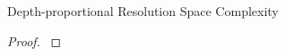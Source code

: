 \begin{theorem}{Depth-proportional Resolution Space Complexity}
\label{thm:depth-proportional-resolution-algo-space-complexity}

\end{theorem}

\begin{proof}
\label{prf:depth-proportional-resolution-algo-space-complexity}
\end{proof}
